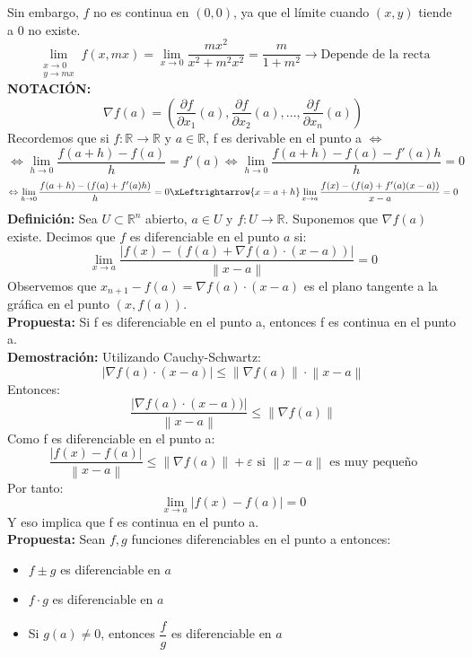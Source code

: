 \documentclass[11pt]{article}
\providecommand{\norm}[1]{\left\lVert #1 \right \rVert}
\providecommand{\abs}[1]{\left\lvert #1\right\rvert}
\providecommand{\norm}[1]{\left\lVert #1 \right \rVert}
\providecommand{\abs}[1]{\left\lvert #1\right\rvert}
\newcommand{\R}{\mathbb{R}}
\theoremstyle{plain}
\begin{document}
            Sin embargo, $f$ no es continua en $(0,0)$, ya que el límite cuando $(x,y)$ tiende a 0 no existe.
            \[\lim_{\substack{x \to 0 \\ y \to mx}} f(x,mx) = \lim_{x \to 0} \frac{mx^2}{x^2 + m^2x^2} = \frac{m}{1 + m^2} \rightarrow \text{Depende de la recta}\]
        \textbf{NOTACIÓN:}
        \begin{equation}
            \nabla f(a) = \left( \frac{\partial f}{\partial x_1}(a), \frac{\partial f}{\partial x_2}(a), ... , \frac{\partial f}{\partial x_n}(a)\right) 
        \end{equation}
        Recordemos que si $f:\R \rightarrow \R$ y $a\in \R$, f es derivable en el punto a $\Leftrightarrow$
        \[\Leftrightarrow \lim_{h \to 0} \frac{f(a+h) - f(a)}{h} = f'(a) \Leftrightarrow \lim_{h \to 0} \frac{f(a+h) - f(a) - f'(a)h}{h} = 0\]
        \[\Leftrightarrow \lim_{h\to 0} \frac{f(a+h) - (f(a)+f'(a)h)}{h} = 0 \xLeftrightarrow{x=a+h} \lim_{x\to a} \frac{f(x) - (f(a)+ f'(a)(x-a))}{x-a} = 0\]
        \textbf{Definición:} Sea $U \subset \R^n$ abierto, $a \in U$ y $f:U\rightarrow \R$. Suponemos que $\nabla f(a)$ existe. Decimos que $f$ es diferenciable en el punto $a$ si:
        \begin{equation}
            \lim_{x \to a} \frac{\abs{f(x) - (f(a) + \nabla f(a)\cdot (x-a))}}{\norm{x-a}} = 0
        \end{equation}
        Observemos que $x_{n+1} - f(a) = \nabla f(a)\cdot(x-a)$ es el plano tangente a la gráfica en el punto $(x,f(a))$.\\
        \textbf{Propuesta:} Si f es diferenciable en el punto a, entonces f es continua en el punto a.\\
        \textbf{Demostración:}
            Utilizando Cauchy-Schwartz:
            \[\abs{\nabla f(a) \cdot (x-a)} \le \norm{\nabla f(a)} \cdot \norm{x-a}\]
            Entonces:
            \[\frac{\abs{\nabla f(a)\cdot (x-a))}}{\norm{x-a}} \le \norm{\nabla f(a)}\]
            Como f es diferenciable en el punto a:
            \[\frac{\abs{f(x)-f(a)}}{\norm{x-a}} \le \norm{\nabla f(a)} + \varepsilon \text{ si } \norm{x-a} \text{ es muy pequeño}\]
            Por tanto:
            \[\lim_{x \to a} \abs{f(x)-f(a)} = 0\]
            Y eso implica que f es continua en el punto a.\\
        \textbf{Propuesta:} Sean $f,g$ funciones diferenciables en el punto a entonces:
        \begin{itemize}
            \item $f\pm g$ es diferenciable en $a$
            \item $f \cdot g$ es diferenciable en $a$
            \item Si $g(a)\ne 0$, entonces $\dfrac{f}{g}$ es diferenciable en $a$ 
        \end{itemize}
\end{document}
